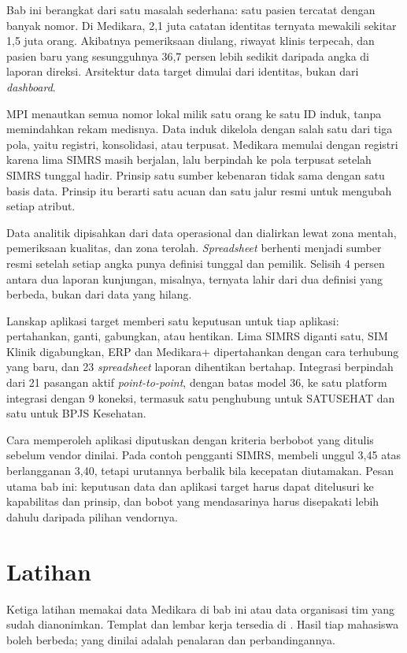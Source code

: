 Bab ini berangkat dari satu masalah sederhana: satu pasien tercatat dengan
banyak nomor. Di Medikara, 2,1 juta catatan identitas ternyata mewakili
sekitar 1,5 juta orang. Akibatnya pemeriksaan diulang, riwayat klinis
terpecah, dan pasien baru yang sesungguhnya 36,7 persen lebih sedikit daripada
angka di laporan direksi. Arsitektur data target dimulai dari identitas, bukan dari
\textit{dashboard}.

MPI menautkan semua nomor lokal milik satu orang ke satu ID induk, tanpa
memindahkan rekam medisnya. Data induk dikelola dengan salah satu dari tiga
pola, yaitu registri, konsolidasi, atau terpusat. Medikara memulai dengan
registri karena lima SIMRS masih berjalan, lalu berpindah ke pola terpusat
setelah SIMRS tunggal hadir. Prinsip satu sumber kebenaran tidak sama dengan
satu basis data. Prinsip itu berarti satu acuan dan satu jalur resmi untuk
mengubah setiap atribut.

Data analitik dipisahkan dari data operasional dan dialirkan lewat zona
mentah, pemeriksaan kualitas, dan zona terolah. \textit{Spreadsheet} berhenti menjadi
sumber resmi setelah setiap angka punya definisi tunggal dan pemilik. Selisih
4 persen antara dua laporan kunjungan, misalnya, ternyata lahir dari dua
definisi yang berbeda, bukan dari data yang hilang.

Lanskap aplikasi target memberi satu keputusan untuk tiap aplikasi:
pertahankan, ganti, gabungkan, atau hentikan. Lima SIMRS diganti satu, SIM
Klinik digabungkan, ERP dan Medikara+ dipertahankan dengan cara terhubung
yang baru, dan 23 \textit{spreadsheet} laporan dihentikan bertahap. Integrasi
berpindah dari 21 pasangan aktif \textit{point-to-point}, dengan batas model 36,
ke satu platform integrasi dengan 9 koneksi, termasuk satu penghubung untuk SATUSEHAT dan
satu untuk BPJS Kesehatan.

Cara memperoleh aplikasi diputuskan dengan kriteria berbobot yang ditulis
sebelum vendor dinilai. Pada contoh pengganti SIMRS, membeli unggul 3,45
atas berlangganan 3,40, tetapi urutannya berbalik bila kecepatan diutamakan.
Pesan utama bab ini: keputusan data dan aplikasi target harus dapat
ditelusuri ke kapabilitas dan prinsip, dan bobot yang mendasarinya harus
disepakati lebih dahulu daripada pilihan vendornya.

\section{Latihan}

Ketiga latihan memakai data Medikara di bab ini atau data organisasi tim yang
sudah dianonimkan. Templat dan lembar kerja tersedia di
. Hasil tiap mahasiswa boleh berbeda; yang
dinilai adalah penalaran dan perbandingannya.


